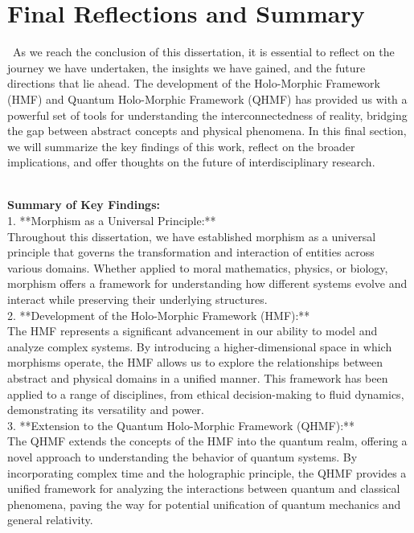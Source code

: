 \documentclass{article}
\begin{document}
\section*{Final Reflections and Summary}
\
As we reach the conclusion of this dissertation, it is essential to reflect on the journey we have undertaken, the insights we have gained, and the future directions that lie ahead. The development of the Holo-Morphic Framework (HMF) and Quantum Holo-Morphic Framework (QHMF) has provided us with a powerful set of tools for understanding the interconnectedness of reality, bridging the gap between abstract concepts and physical phenomena. In this final section, we will summarize the key findings of this work, reflect on the broader implications, and offer thoughts on the future of interdisciplinary research.
\\
\

\textbf{Summary of Key Findings:}
\\

1. **Morphism as a Universal Principle:**
\\

   Throughout this dissertation, we have established morphism as a universal principle that governs the transformation and interaction of entities across various domains. Whether applied to moral mathematics, physics, or biology, morphism offers a framework for understanding how different systems evolve and interact while preserving their underlying structures.
\\

2. **Development of the Holo-Morphic Framework (HMF):**
\\

   The HMF represents a significant advancement in our ability to model and analyze complex systems. By introducing a higher-dimensional space in which morphisms operate, the HMF allows us to explore the relationships between abstract and physical domains in a unified manner. This framework has been applied to a range of disciplines, from ethical decision-making to fluid dynamics, demonstrating its versatility and power.
\\

3. **Extension to the Quantum Holo-Morphic Framework (QHMF):**
\\

   The QHMF extends the concepts of the HMF into the quantum realm, offering a novel approach to understanding the behavior of quantum systems. By incorporating complex time and the holographic principle, the QHMF provides a unified framework for analyzing the interactions between quantum and classical phenomena, paving the way for potential unification of quantum mechanics and general relativity.
\\
\end{document}
